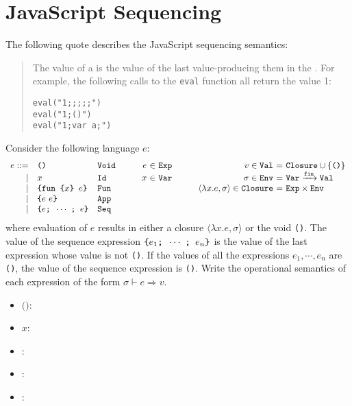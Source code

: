\section{JavaScript Sequencing}

The following quote describes the JavaScript sequencing semantics:
\begin{quote}
The value of a  is the value of the last
value-producing them in the .  For example, the
following calls to the \verb!eval! function all return the value 1:
\begin{verbatim}
eval("1;;;;;")
eval("1;()")
eval("1;var a;")
\end{verbatim}
\end{quote}
Consider the following language $e$:
\[
\begin{array}{rlllr@{~}c@{~}ll r@{~}c@{~}l}
e ::= & \verb!()! & \texttt{Void}
&\quad& e &\in& \texttt{Exp}
&\quad& v \in \texttt{Val} &=& \texttt{Closure} \cup \lbrace \texttt{()} \rbrace\\
\mid& x & \texttt{Id}
&&  x &\in& \texttt{Var}
&&\sigma \in \texttt{Env} &=& \texttt{Var} \xrightarrow{\texttt{fin}} \texttt{Val}\\
\mid& \verb!{fun {! x\verb+} +e\verb+}+ & \texttt{Fun}
&&&&
&&\langle \lambda x. e, \sigma\rangle \in \texttt{Closure} &=& \texttt{Exp} \times \texttt{Env}\\
\mid& \verb!{!e\ e\verb+}+ & \texttt{App}\\
\mid& \verb!{!e\verb!; !\cdots\ \verb!; ! e\verb+}+ & \texttt{Seq}\\
\end{array}
\]
where evaluation of $e$ results in either a closure
$\langle \lambda x.e, \sigma\rangle$ or the void \verb!()!.
The value of the sequence expression $\verb!{!e_1\verb!; !\cdots\ \verb!; ! e_n\verb+}+$
is the value of the last expression whose value is not \verb!()!.
If the values of all the expressions $e_1, \cdots, e_n$ are \verb!()!,
the value of the sequence expression is \verb!()!.
Write the operational semantics of each expression of the form
$\sigma \vdash e \Rightarrow v$. 

\begin{itemize}
  \item \underline{$\texttt{()}$}:
  \item \underline{$x$}:
  \item \underline{\texttt{}}:
  \item \underline{\texttt{}}:
  \item \underline{\texttt{}}:
\end{itemize}
